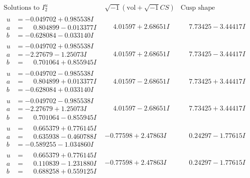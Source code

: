 \documentclass[1p]{elsarticle_modified}
\theoremstyle{definition}
\newcommand{\I}{\sqrt{-1}}
\begin{document}
$$\begin{array}{c|c|c}  
\text{Solutions to }I^u_{2}& \I (\text{vol} + \sqrt{-1}CS) & \text{Cusp shape}\\
 \hline 
\begin{aligned}
u &= -0.049702 + 0.985538 I \\
a &= \phantom{-}0.804899 - 0.013377 I \\
b &= -0.628084 - 0.033140 I\end{aligned}
 & \phantom{-}4.01597 + 2.68651 I & \phantom{-}7.73425 - 3.44417 I \\ \hline\begin{aligned}
u &= -0.049702 + 0.985538 I \\
a &= -2.27679 - 1.25073 I \\
b &= \phantom{-}0.701064 + 0.855945 I\end{aligned}
 & \phantom{-}4.01597 + 2.68651 I & \phantom{-}7.73425 - 3.44417 I \\ \hline\begin{aligned}
u &= -0.049702 - 0.985538 I \\
a &= \phantom{-}0.804899 + 0.013377 I \\
b &= -0.628084 + 0.033140 I\end{aligned}
 & \phantom{-}4.01597 - 2.68651 I & \phantom{-}7.73425 + 3.44417 I \\ \hline\begin{aligned}
u &= -0.049702 - 0.985538 I \\
a &= -2.27679 + 1.25073 I \\
b &= \phantom{-}0.701064 - 0.855945 I\end{aligned}
 & \phantom{-}4.01597 - 2.68651 I & \phantom{-}7.73425 + 3.44417 I \\ \hline\begin{aligned}
u &= \phantom{-}0.665379 + 0.776145 I \\
a &= \phantom{-}0.635938 - 0.460788 I \\
b &= -0.589255 - 1.034860 I\end{aligned}
 & -0.77598 + 2.47863 I & \phantom{-}0.24297 - 1.77615 I \\ \hline\begin{aligned}
u &= \phantom{-}0.665379 + 0.776145 I \\
a &= \phantom{-}0.110839 - 1.231880 I \\
b &= \phantom{-}0.688258 + 0.559125 I\end{aligned}
 & -0.77598 + 2.47863 I & \phantom{-}0.24297 - 1.77615 I \\ \hline\begin{aligned}

\end{aligned}
\end{array}$$
\end{document}
